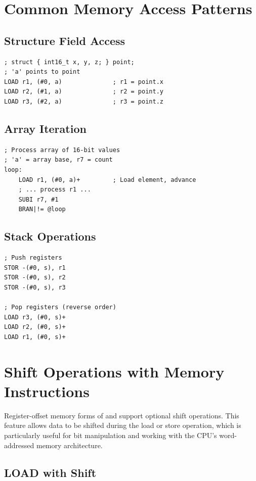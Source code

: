 \section{Common Memory Access Patterns}

\subsection{Structure Field Access}
\begin{lstlisting}
; struct { int16_t x, y, z; } point;
; 'a' points to point
LOAD r1, (#0, a)              ; r1 = point.x
LOAD r2, (#1, a)              ; r2 = point.y
LOAD r3, (#2, a)              ; r3 = point.z
\end{lstlisting}

\subsection{Array Iteration}
\begin{lstlisting}
; Process array of 16-bit values
; 'a' = array base, r7 = count
loop:
    LOAD r1, (#0, a)+         ; Load element, advance
    ; ... process r1 ...
    SUBI r7, #1
    BRAN|!= @loop
\end{lstlisting}

\subsection{Stack Operations}
\begin{lstlisting}
; Push registers
STOR -(#0, s), r1
STOR -(#0, s), r2
STOR -(#0, s), r3

; Pop registers (reverse order)
LOAD r3, (#0, s)+
LOAD r2, (#0, s)+
LOAD r1, (#0, s)+
\end{lstlisting}

\section{Shift Operations with Memory Instructions}
\label{sec:memory-shifts}

Register-offset memory forms of  and  support optional shift operations. This feature
allows data to be shifted during the load or store operation, which is particularly useful for bit manipulation and
working with the CPU's word-addressed memory architecture.

\subsection{LOAD with Shift}

